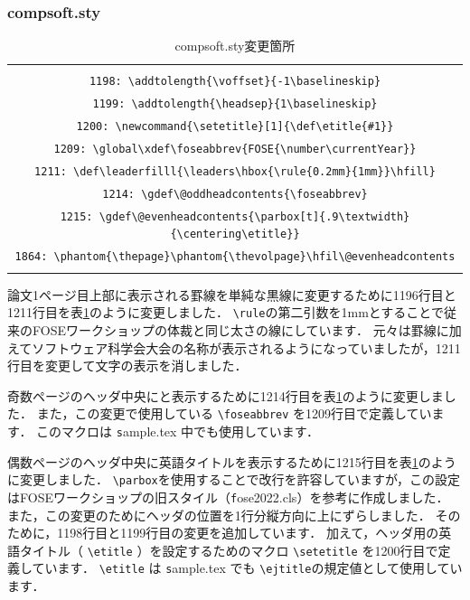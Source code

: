 \documentclass[T,J]{fose} %
\begin{document}
\subsubsection*{compsoft.sty}
\begin{table}[t]
	\centering
	\caption{compsoft.sty変更箇所}
	\label{table:change1}
	\small
	\doublerulesep=0.3pt
 	\begin{tabular}{c}
		\begin{tabularx}{47zw}{X}
		\hline\hline\hline
		\verb|1196: \def\leaderfilll{\leaders\hbox{\rule{0.2mm}{1mm}}\hfill}| \\
		\verb|1198: \addtolength{\voffset}{-1\baselineskip}| \\
		\verb|1199: \addtolength{\headsep}{1\baselineskip}| \\
		\verb|1200: \newcommand{\setetitle}[1]{\def\etitle{#1}}| \\
		\verb|1209: \global\xdef\foseabbrev{FOSE{\number\currentYear}}| \\
		\verb|1211: \def\leaderfilll{\leaders\hbox{\rule{0.2mm}{1mm}}\hfill}| \\
		\verb|1214: \gdef\@oddheadcontents{\foseabbrev}| \\
		\verb|1215: \gdef\@evenheadcontents{\parbox[t]{.9\textwidth}{\centering\etitle}}| \\
		\verb|1864: \phantom{\thepage}\phantom{\thevolpage}\hfil\@evenheadcontents| \\
		\hline
		\end{tabularx}
	\end{tabular}
\end{table}

論文1ページ目上部に表示される罫線を単純な黒線に変更するために1196行目と1211行目を表\ref{table:change1}のように変更しました．
\verb|\rule|の第二引数を1mmとすることで従来のFOSEワークショップの体裁と同じ太さの線にしています．
元々は罫線に加えてソフトウェア科学会大会の名称が表示されるようになっていましたが，1211行目を変更して文字の表示を消しました．

奇数ページのヘッダ中央に{\textbf \foseabbrev}と表示するために1214行目を表\ref{table:change1}のように変更しました．
また，この変更で使用している \verb|\foseabbrev| を1209行目で定義しています．
このマクロは {\texttt sample.tex} 中でも使用しています．

偶数ページのヘッダ中央に英語タイトルを表示するために1215行目を表\ref{table:change1}のように変更しました．
\verb|\parbox|を使用することで改行を許容していますが，この設定はFOSEワークショップの旧スタイル（{\texttt fose2022.cls}）を参考に作成しました．
また，この変更のためにヘッダの位置を1行分縦方向に上にずらしました．
そのために，1198行目と1199行目の変更を追加しています．
加えて，ヘッダ用の英語タイトル（ \verb|\etitle| ）を設定するためのマクロ \verb|\setetitle| を1200行目で定義しています．
\verb|\etitle| は {\texttt sample.tex} でも \verb|\ejtitle|の規定値として使用しています．
\end{document}
